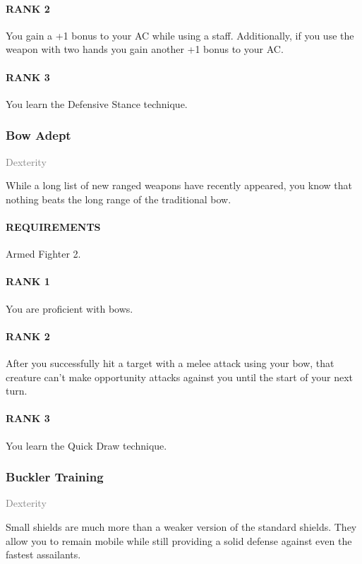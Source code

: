 \paragraph{RANK 2} You gain a +1 bonus to your AC while using a staff.
Additionally, if you use the weapon with two hands you gain another +1 bonus to your AC.
\paragraph{RANK 3} You learn the Defensive Stance technique.

\subsubsection{Bow Adept} \label{feat::bowadept}
\small{\textcolor{gray}{Dexterity}}

\normalsize
While a long list of new ranged weapons have recently appeared, you know that nothing beats the long range of the traditional bow.
\paragraph{REQUIREMENTS} Armed Fighter 2.
\paragraph{RANK 1} You are proficient with bows.
\paragraph{RANK 2} After you successfully hit a target with a melee attack using your bow, that creature can't make opportunity attacks against you until the start of your next turn.
\paragraph{RANK 3} You learn the Quick Draw technique.

\subsubsection{Buckler Training} \label{feat::bucklertraining}
\small{\textcolor{gray}{Dexterity}}

\normalsize
Small shields are much more than a weaker version of the standard shields.
They allow you to remain mobile while still providing a solid defense against even the fastest assailants.
